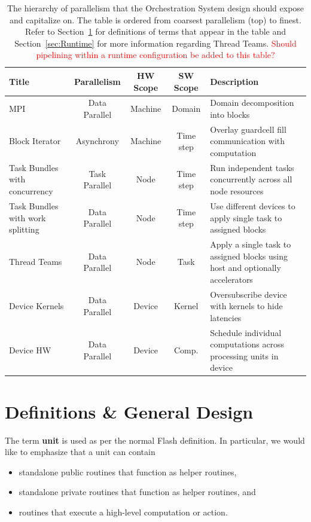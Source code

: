\documentclass{article}
\begin{document}
\begin{table}[!t]
\label{tab:ParallelHierarchy}
\caption{The hierarchy of parallelism that the Orchestration System design
should expose and capitalize on.  The table is ordered from coarsest parallelism
(top) to finest.  Refer to Section~\ref{sec:Definitions} for definitions of
terms that appear in the table and Section~\ref{sec:Runtime} for more
information regarding Thread Teams.  \textcolor{red}{Should pipelining within a
runtime configuration be added to this table?}}

\begin{center}

\begin{tabular}{|p{1.1in}|c|c|c|p{2.25in}|}
\hline
Title & Parallelism & HW Scope & SW Scope & Description\\
\hline
\hline
MPI                              & Data Parallel & Machine & Domain    & Domain decomposition into blocks\\
\hline
Block Iterator                   & Asynchrony    & Machine & Time step & Overlay guardcell fill communication with computation\\
\hline
Task Bundles with concurrency    & Task Parallel & Node    & Time step & Run independent tasks concurrently across all node resources\\
\hline
Task Bundles with work splitting & Data Parallel & Node    & Time step & Use different devices to apply single task to assigned blocks\\ 
\hline
Thread Teams                     & Data Parallel & Node    & Task      & Apply a single task to assigned blocks using host and optionally accelerators\\
\hline
Device Kernels                   & Data Parallel & Device  & Kernel    & Oversubscribe device with kernels to hide latencies\\
\hline
Device HW                        & Data Parallel & Device  & Comp.     & Schedule individual computations across processing units in device\\
\hline
\end{tabular}

\end{center}
\end{table}

\section{Definitions \& General Design}
\label{sec:Definitions}
The term \textbf{unit} is used as per the normal Flash definition.  In
particular, we would like to emphasize that a unit can contain
\begin{itemize}
\item{standalone public routines that function as helper routines,}
\item{standalone private routines that function as helper routines, and}
\item{routines that execute a high-level computation or action.}
\end{itemize}
\end{document}
